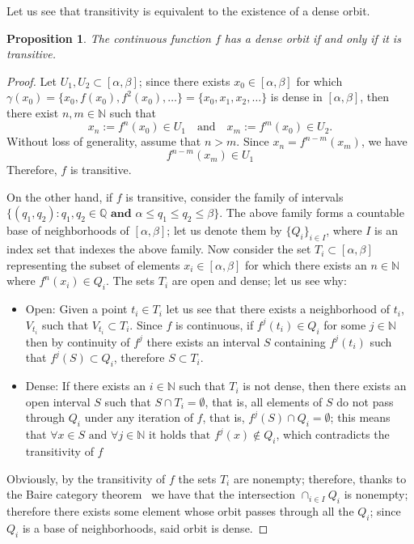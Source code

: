 \documentclass[12pt,a4paper]{report}
\newtheorem{proposicion}{Proposition}[section]
\theoremstyle{definition}
\begin{document}
Let us see that transitivity is equivalent to the existence of a dense orbit. 

\begin{proposicion}\label{Prop3.1}
The continuous function $f$ has a dense orbit if and only if it is transitive.
\end{proposicion}

\begin{proof}
Let $U_1, U_2 \subset [\alpha,\beta]$; since there exists $x_0 \in [\alpha,\beta]$ for which
\newline
$\gamma(x_0) = \{x_0, f(x_0), f^2(x_0), \dots\} = \{x_0, x_1, x_2, \dots\}$
is dense in $[\alpha,\beta]$, then there exist $n, m \in \mathbb{N}$ such that  
\[
x_n := f^n(x_0) \in U_1 \quad \text{and} \quad x_m := f^m(x_0) \in U_2.
\]  
Without loss of generality, assume that $n > m$.  
Since $x_n = f^{n-m}(x_m)$, we have  
\[
f^{n-m}(x_m) \in U_1
\]  
Therefore, $f$ is transitive.

On the other hand, if $f$ is transitive, consider the family of intervals 
\newline
$\{(q_1,q_2) \colon q_1,q_2 \in \mathbb{Q} \textbf{ and } \alpha \leq q_1 \leq q_2 \leq \beta \}$. The above family forms a countable base of neighborhoods of $[\alpha,\beta]$; let us denote them by $\{ Q_i\}_{i \in I}$, where $I$ is an index set that indexes the above family. Now consider the set $T_i \subset [\alpha,\beta]$ representing the subset of elements $x_i \in [\alpha,\beta]$ for which there exists an $n \in \mathbb{N}$ where $f^n(x_i) \in Q_i$. The sets $T_i$ are open and dense; let us see why:

\begin{itemize}
    \item Open: Given a point $t_i \in T_i$ let us see that there exists a neighborhood of $t_i$, $V_{t_i}$ such that $V_{t_i} \subset T_i$. Since $f$ is continuous, if $f^j(t_i) \in Q_i$ for some $j \in \mathbb{N}$ then by continuity of $f^j$ there exists an interval $S$ containing $f^j(t_i)$ such that $f^j(S) \subset Q_i$, therefore $S \subset T_i$. 


    \item Dense: If there exists an $i \in \mathbb{N}$ such that $T_i$ is not dense, then there exists an open interval $S$ such that $S \cap T_i = \emptyset$, that is, all elements of $S$ do not pass through $Q_i$ under any iteration of $f$, that is, $f^j(S) \cap Q_i = \emptyset$; this means that $\forall x \in S \text{ and } \forall j \in \mathbb{N} \text{ it holds that } f^j(x) \notin Q_i$, which contradicts the transitivity of $f$
\end{itemize}

Obviously, by the transitivity of $f$ the sets $T_i$ are nonempty; therefore, thanks to the Baire category theorem~\cite{ref3} we have that the intersection $\cap_{i \in I}Q_i$ is nonempty; therefore there exists some element whose orbit passes through all the $Q_i$; since $Q_i$ is a base of neighborhoods, said orbit is dense.

\end{proof}
\end{document}
